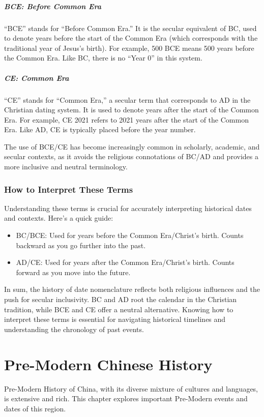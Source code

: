 \documentclass[a4paper,12pt]{book}
\begin{document}
\paragraph{BCE: Before Common Era}
``BCE'' stands for ``Before Common Era.'' It is the secular equivalent of BC, used to denote years before the start of the Common Era (which corresponds with the traditional year of Jesus’s birth). For example, 500 BCE means 500 years before the Common Era. Like BC, there is no ``Year 0'' in this system.

\paragraph{CE: Common Era}
``CE'' stands for ``Common Era,'' a secular term that corresponds to AD in the Christian dating system. It is used to denote years after the start of the Common Era. For example, CE 2021 refers to 2021 years after the start of the Common Era. Like AD, CE is typically placed before the year number.

The use of BCE/CE has become increasingly common in scholarly, academic, and secular contexts, as it avoids the religious connotations of BC/AD and provides a more inclusive and neutral terminology.

\subsection*{How to Interpret These Terms}
Understanding these terms is crucial for accurately interpreting historical dates and contexts. Here’s a quick guide:

\begin{itemize}
    \item BC/BCE: Used for years before the Common Era/Christ’s birth. Counts backward as you go further into the past.
    \item AD/CE: Used for years after the Common Era/Christ’s birth. Counts forward as you move into the future.
\end{itemize}

In sum, the history of date nomenclature reflects both religious influences and the push for secular inclusivity. BC and AD root the calendar in the Christian tradition, while BCE and CE offer a neutral alternative. Knowing how to interpret these terms is essential for navigating historical timelines and understanding the chronology of past events.

\chapter{Pre-Modern Chinese History}
Pre-Modern History of China, with its diverse mixture of cultures and languages, is extensive and rich. This chapter explores important Pre-Modern events and dates of this region.
\end{document}
